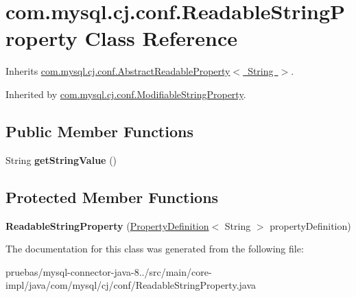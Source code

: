 \hypertarget{classcom_1_1mysql_1_1cj_1_1conf_1_1_readable_string_property}{}\section{com.\+mysql.\+cj.\+conf.\+Readable\+String\+Property Class Reference}
\label{classcom_1_1mysql_1_1cj_1_1conf_1_1_readable_string_property}


Inherits \mbox{\hyperlink{classcom_1_1mysql_1_1cj_1_1conf_1_1_abstract_readable_property}{com.\+mysql.\+cj.\+conf.\+Abstract\+Readable\+Property$<$ String $>$}}.



Inherited by \mbox{\hyperlink{classcom_1_1mysql_1_1cj_1_1conf_1_1_modifiable_string_property}{com.\+mysql.\+cj.\+conf.\+Modifiable\+String\+Property}}.

\subsection*{Public Member Functions}
\begin{DoxyCompactItemize}
\item 
\mbox{\label{classcom_1_1mysql_1_1cj_1_1conf_1_1_readable_string_property_a80f31bf0ff94266fcec3d38571797c65}} 
String {\bfseries get\+String\+Value} ()
\end{DoxyCompactItemize}
\subsection*{Protected Member Functions}
\begin{DoxyCompactItemize}
\item 
\mbox{\label{classcom_1_1mysql_1_1cj_1_1conf_1_1_readable_string_property_a69329b92e69ca795dd06ae687d7dff99}} 
{\bfseries Readable\+String\+Property} (\mbox{\hyperlink{interfacecom_1_1mysql_1_1cj_1_1conf_1_1_property_definition}{Property\+Definition}}$<$ String $>$ property\+Definition)
\end{DoxyCompactItemize}


The documentation for this class was generated from the following file\+:\begin{DoxyCompactItemize}
\item 
pruebas/mysql-\/connector-\/java-\/8../src/main/core-\/impl/java/com/mysql/cj/conf/Readable\+String\+Property.\+java\end{DoxyCompactItemize}
